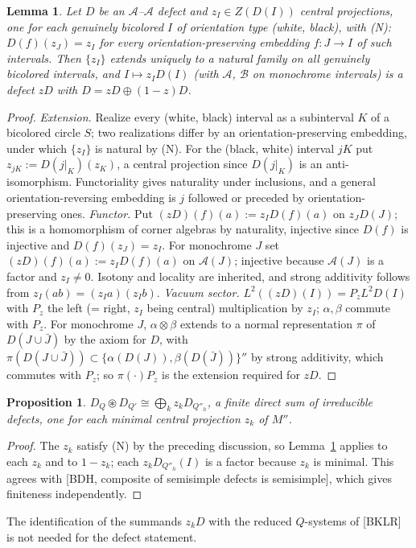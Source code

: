 \documentclass[11pt]{article}
\newtheorem{lemma}[theorem]{Lemma}
\newtheorem{proposition}[theorem]{Proposition}
\theoremstyle{definition}
\theoremstyle{remark}
\newcommand{\cA}{\mathcal A}
\newcommand{\cB}{\mathcal B}
\newcommand{\cfus}{\circledast}
\begin{document}
\begin{lemma}\label{lem:summand}
Let $D$ be an $\cA$--$\cA$ defect and $z_I\in Z(D(I))$ central projections, one for each genuinely bicolored $I$ of orientation type (white, black), with \textup{(N)}: $D(f)(z_J)=z_I$ for every orientation-preserving embedding $f\colon J\to I$ of such intervals. Then $\{z_I\}$ extends uniquely to a natural family on all genuinely bicolored intervals, and $I\mapsto z_ID(I)$ (with $\cA$, $\cB$ on monochrome intervals) is a defect $zD$ with $D=zD\oplus(1-z)D$.
\end{lemma}
\begin{proof}
\emph{Extension.} Realize every (white, black) interval as a subinterval $K$ of a bicolored circle $S$; two realizations differ by an orientation-preserving embedding, under which $\{z_I\}$ is natural by (N). For the (black, white) interval $jK$ put $z_{jK}:=D(j|_K)(z_K)$, a central projection since $D(j|_K)$ is an anti-isomorphism. Functoriality gives naturality under inclusions, and a general orientation-reversing embedding is $j$ followed or preceded by orientation-preserving ones.
\emph{Functor.} Put $(zD)(f)(a):=z_ID(f)(a)$ on $z_JD(J)$; this is a homomorphism of corner algebras by naturality, injective since $D(f)$ is injective and $D(f)(z_J)=z_I$. For monochrome $J$ set $(zD)(f)(a):=z_ID(f)(a)$ on $\cA(J)$; injective because $\cA(J)$ is a factor and $z_I\neq0$. Isotony and locality are inherited, and strong additivity follows from $z_I(ab)=(z_Ia)(z_Ib)$.
\emph{Vacuum sector.} $L^2((zD)(I))=P_zL^2D(I)$ with $P_z$ the left (= right, $z_I$ being central) multiplication by $z_I$; $\alpha,\beta$ commute with $P_z$. For monochrome $J$, $\alpha\otimes\beta$ extends to a normal representation $\pi$ of $D(J\cup\bar J)$ by the axiom for $D$, with $\pi(D(J\cup\bar J))\subset\{\alpha(D(J)),\beta(D(\bar J))\}''$ by strong additivity, which commutes with $P_z$; so $\pi(\cdot)P_z$ is the extension required for $zD$.
\end{proof}

\begin{proposition}\label{prop:red}
$D_Q\cfus D_{Q'}\cong\bigoplus_kz_kD_{Q''_h}$, a finite direct sum of irreducible defects, one for each minimal central projection $z_k$ of $M''$.
\end{proposition}
\begin{proof}
The $z_k$ satisfy (N) by the preceding discussion, so Lemma~\ref{lem:summand} applies to each $z_k$ and to $1-z_k$; each $z_kD_{Q''_h}(I)$ is a factor because $z_k$ is minimal. This agrees with [BDH, composite of semisimple defects is semisimple], which gives finiteness independently.
\end{proof}
The identification of the summands $z_kD$ with the reduced $Q$-systems of [BKLR] is not needed for the defect statement.
\end{document}
